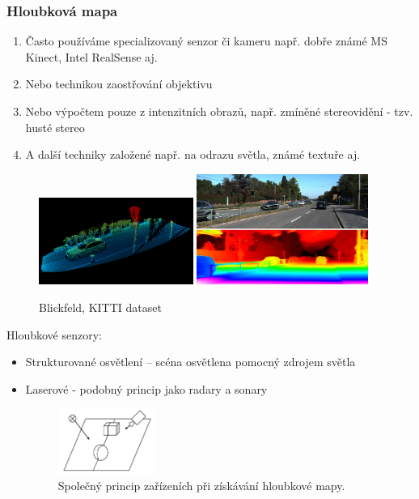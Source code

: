 \begin{frame}
\frametitle{Hloubková mapa}
\begin{enumerate}
	\item Často používáme specializovaný senzor či kameru např. dobře známé MS Kinect, Intel RealSense aj. 
	\item Nebo technikou zaostřování objektivu
	\item Nebo výpočtem pouze z intenzitních obrazů, např. zmíněné stereovidění - tzv. husté stereo
	\item A další techniky založené např. na odrazu světla, známé textuře aj.
\end{enumerate}
	\begin{figure}[!ht]
	\centering
	\includegraphics[width = 0.45\textwidth]{./lidar-car}
	\includegraphics[width = 0.5\textwidth]{./kitti}
	\caption{Blickfeld, KITTI dataset}
	\end{figure}
\end{frame}

\begin{frame}
Hloubkové senzory:
\begin{itemize}
\item Strukturované osvětlení – scéna osvětlena pomocný zdrojem světla
\item Laserové - podobný princip jako radary a sonary 

	\begin{figure}[!ht]
	\centering
	\includegraphics[width = 0.3\textwidth]{./prouzek}
	\caption{Společný princip zařízeních při získávání hloubkové mapy.}
	\end{figure}

\end{itemize}
\end{frame}

